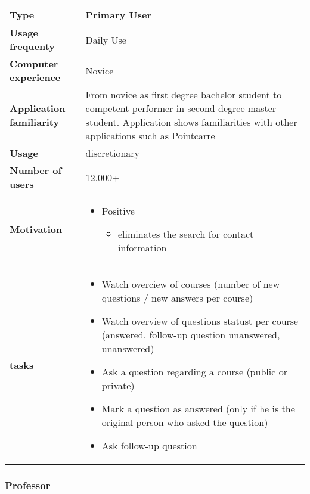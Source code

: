 \documentclass[10pt]{report}
\begin{document}
\begin{tabular}{ | l | p{10cm} |}
\hline
\textbf{Type} & Primary User \\ \hline
\textbf{Usage frequenty} & Daily Use \\ \hline
\textbf{Computer experience} & Novice \\ \hline
\textbf{Application familiarity} & From novice as first degree bachelor student to competent performer in second degree master student. Application shows familiarities with other applications such as Pointcarre\\ \hline
\textbf{Usage} & discretionary\\ \hline
\textbf{Number of users} & 12.000+\\ \hline
\textbf{Motivation} & 
	\begin{itemize}
		\item Positive 
		\begin{itemize}
			\item eliminates the search for contact information
		\end{itemize}
	\end{itemize} \\ \hline
\textbf{tasks} & 
	\begin{itemize}
		\item Watch overciew of courses (number of new questions / new answers per course)
		\item Watch overview of questions statust per course (answered, follow-up question unanswered, unanswered)
		\item Ask a question regarding a course (public or private)
		\item Mark a question as answered (only if he is the original person who asked the question)
		\item Ask follow-up question
	\end{itemize} \\ \hline
\end{tabular}

\subsubsection{Professor}
\end{document}
